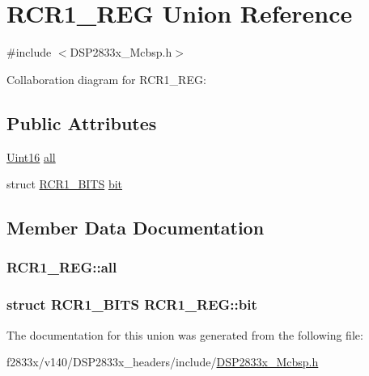 \hypertarget{union_r_c_r1___r_e_g}{}\section{R\+C\+R1\+\_\+\+R\+E\+G Union Reference}
\label{union_r_c_r1___r_e_g}


{\ttfamily \#include $<$D\+S\+P2833x\+\_\+\+Mcbsp.\+h$>$}



Collaboration diagram for R\+C\+R1\+\_\+\+R\+E\+G\+:
\subsection*{Public Attributes}
\begin{DoxyCompactItemize}
\item 
\hyperlink{_d_s_p2833x___device_8h_a59a9f6be4562c327cbfb4f7e8e18f08b}{Uint16} \hyperlink{union_r_c_r1___r_e_g_a2553fc3cb1d4e6686b9aee930baaee7f}{all}
\item 
struct \hyperlink{struct_r_c_r1___b_i_t_s}{R\+C\+R1\+\_\+\+B\+I\+T\+S} \hyperlink{union_r_c_r1___r_e_g_a6126b4b87e2e223cb86111c91b19e172}{bit}
\end{DoxyCompactItemize}


\subsection{Member Data Documentation}
\hypertarget{union_r_c_r1___r_e_g_a2553fc3cb1d4e6686b9aee930baaee7f}{}
\subsubsection[{all}]{ R\+C\+R1\+\_\+\+R\+E\+G\+::all}\label{union_r_c_r1___r_e_g_a2553fc3cb1d4e6686b9aee930baaee7f}
\hypertarget{union_r_c_r1___r_e_g_a6126b4b87e2e223cb86111c91b19e172}{}
\subsubsection[{bit}]{\setlength{\rightskip}{0pt plus 5cm}struct {\bf R\+C\+R1\+\_\+\+B\+I\+T\+S} R\+C\+R1\+\_\+\+R\+E\+G\+::bit}\label{union_r_c_r1___r_e_g_a6126b4b87e2e223cb86111c91b19e172}


The documentation for this union was generated from the following file\+:\begin{DoxyCompactItemize}
\item 
f2833x/v140/\+D\+S\+P2833x\+\_\+headers/include/\hyperlink{_d_s_p2833x___mcbsp_8h}{D\+S\+P2833x\+\_\+\+Mcbsp.\+h}\end{DoxyCompactItemize}
